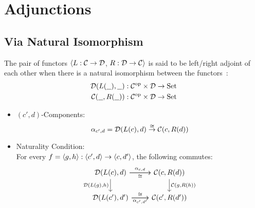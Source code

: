 \section{Adjunctions}

\subsection{Via Natural Isomorphism}

\begin{definition}
  The pair of functors $\langle L: \mathcal{C}\to \mathcal{D}$, $R: \mathcal{D}\to \mathcal{C}\rangle$ is said to be left/right
  adjoint of each other when there is a natural isomorphism between the
  functors~\parencite{leinster:basic_category_theory}:
  \[
    \begin{aligned}
      \mathcal{D}(L(\underline{\ \ }), \underline{\ \ })
        &: \mathcal{C}^{\mathrm{op}} \times \mathcal{D} \to \mathrm{Set}\\
      \mathcal{C}(\underline{\ \ }, R(\underline{\ \ }))
        &: \mathcal{C}^{\mathrm{op}} \times \mathcal{D} \to \mathrm{Set}\\
    \end{aligned}
  \]

  \begin{itemize}
    \item $(c', d)$-Components:
      \[
        \alpha_{c', d}
          = \mathcal{D}(L(c), d) \overset{\cong}{\to} \mathcal{C}(c, R(d))\\
      \]
    \item Naturality Condition:\\
      For every $f = \langle g, h\rangle: \langle c', d\rangle \to \langle c, d'\rangle$, the following commutes:
      \[\begin{tikzcd}[ampersand replacement=\&]
        {\D(L(c), d)} \& {\C(c, R(d))} \\
        {\D(L(c'),d')} \& {\C(c',R(d'))}
        \arrow["{\D(L(g), h)}"', from=1-1, to=2-1]
        \arrow["{\C(g, R(h))}", from=1-2, to=2-2]
        \arrow["{\alpha_{c, d}}", from=1-1, to=1-2]
        \arrow["{\alpha_{c',d'}}"', from=2-1, to=2-2]
        \arrow["\cong"', from=1-1, to=1-2]
        \arrow["\cong", from=2-1, to=2-2]
      \end{tikzcd}\]
  \end{itemize}
\end{definition}

